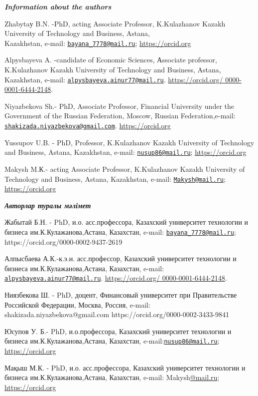 \begin{authorinfo}
\emph{{\bfseries Information about the authors}}

Zhabytaу B.N. -PhD, acting Associate Professor, K.Kulazhanov Kazakh
University of Technology and Business, Astana, \\Kazakhstan, e-mail:
\href{mailto:bayana_7778@mail.ru}{\nolinkurl{bayana\_7778@mail.ru}};
\href{https://orcid.org/0000-0002-9437-2619}{https://orcid.org}

Alpysbayeva A. -candidate of Economic Sciences, Аssociate professor,
K.Kulazhanov Kazakh University of Technology and Business, Astana,
Kazakhstan, e-mail:
\href{mailto:alpysbayeva.ainur77@mail.ru}{\nolinkurl{alpysbayeva.ainur77@mail.ru}}.
\href{https://orcid.org/\%200000-0001-6444-2148}{https://orcid.org/
0000-0001-6444-2148}.

Niyazbekova Sh.- PhD, Associate Professor, Financial University under
the Government of the Russian Federation, Moscow, Russian
Federation,e-mail:
\href{mailto:shakizada.niyazbekova@gmail.com}{\nolinkurl{shakizada.niyazbekova@gmail.com}}.
\href{https://orcid.org/0000-0002-3433-9841}{https://orcid.org}

Yussupov U.B. - PhD, Professor, K.Kulazhanov Kazakh University of
Technology and Business, Astana, Kazakhstan, e-mail:
\href{mailto:nusup86@mail.ru}{\nolinkurl{nusup86@mail.ru}};
\href{https://orcid.org/0000-0002-7706-3195}{https://orcid.org}

Makysh M.К.- acting Associate Professor, K.Kulazhanov Kazakh University
of Technology and Business, Astana, Kazakhstan, e-mail:
\href{mailto:Makysh@mail.ru}{\nolinkurl{Makysh@mail.ru}};
\href{https://orcid.org/0000-0001-9630-2772}{https://orcid.org}

\emph{{\bfseries Авторлар туралы мәлімет}}

Жабытай Б.Н. - PhD, и.о. асс.профессора, Казахский университет
технологии и бизнеса им.К.Кулажанова,Астана, Казахстан, e-mail:
\href{mailto:bayana_7778@mail.ru}{\nolinkurl{bayana\_7778@mail.ru}};
https://orcid.org/0000-0002-9437-2619

Алпысбаева А.К.-к.э.н. асс.профессор, Казахский университет технологии и
бизнеса им.К.Кулажанова,Астана, Казахстан, e-mail:
\href{mailto:alpysbayeva.ainur77@mail.ru}{\nolinkurl{alpysbayeva.ainur77@mail.ru}}.
\href{https://orcid.org/\%200000-0001-6444-2148}{https://orcid.org/
0000-0001-6444-2148}.

Ниязбекова Ш. - PhD, доцент, Финансовый университет при Правительстве
Российской Федерации, Москва, Россия, e-mail:
shakizada.niyazbekova@gmail.com https://orcid.org/0000-0002-3433-9841

Юсупов У. Б.- PhD, и.о.профессора, Казахский университет технологии и
бизнеса им.К.Кулажанова,Астана, Казахстан,
e-mail:\href{mailto:nusup86@mail.ru}{\nolinkurl{nusup86@mail.ru}};
\href{https://orcid.org/0000-0002-7706-3195}{https://orcid.org}

Мақыш М.К. - PhD, и.о. асс.профессора, Казахский университет технологии
и бизнеса им.К.Кулажанова,Астана, Казахстан, e-mail:
Makysh\href{mailto:bayana_7778@mail.ru}{@mail.ru};
\href{https://orcid.org/0000-0001-9630-2772}{https://orcid.org}
\end{authorinfo}
